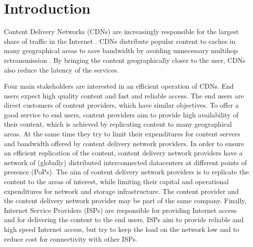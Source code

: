 \chapter{Introduction}\label{chap:introduction}

Content Delivery Networks (CDNs) are increasingly responsible for the largest share of traffic in the Internet \cite{cisco2016}.
CDNs distribute popular content to caches in many geographical areas to save bandwidth by avoiding unnecessary multihop retransmission \cite{paschos2016wireless}.
By bringing the content geographically closer to the user, CDNs also reduce the latency of the services.

Four main stakeholders are interested in an efficient operation of CDNs.
End users expect high quality content and fast and reliable access.
The end users are direct customers of content providers, which have similar objectives.
To offer a good service to end users, content providers aim to provide high availability of their content, which is achieved by replicating content to many geographical areas.
At the same time they try to limit their expenditures for content servers and bandwidth offered by content delivery network providers.
In order to ensure an efficient replication of the content, content delivery network providers have a network of (globally) distributed interconnected datacenters at different points of presence (PoPs).
The aim of content delivery network providers is to replicate the content to the areas of interest, while limiting their capital and operational expenditures for network and storage infrastructure.
The content provider and the content delivery network provider may be part of the same company.
Finally, Internet Service Providers (ISPs) are responsible for providing Internet access and for delivering the content to the end users.
ISPs aim to provide reliable and high speed Internet access, but try to keep the load on the network low and to reduce cost for connectivity with other ISPs.


